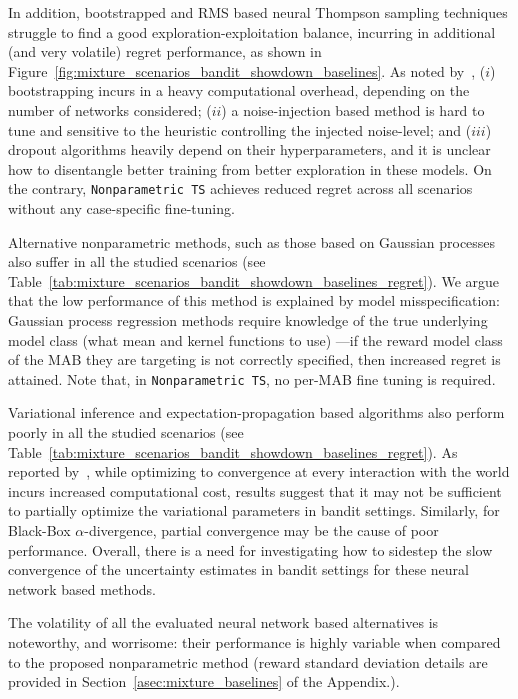 In addition, bootstrapped and RMS based neural Thompson sampling techniques struggle to find a good exploration-exploitation balance, incurring in additional (and very volatile) regret performance, as shown in Figure~\ref{fig:mixture_scenarios_bandit_showdown_baselines}.
As noted by~\citet{ip-Riquelme2018}, ($i$) bootstrapping incurs in a heavy computational overhead, depending on the number of networks considered; ($ii$) a noise-injection based method is hard to tune and sensitive to the heuristic controlling the injected noise-level; and ($iii$) dropout algorithms heavily depend on their hyperparameters, and it is unclear how to disentangle better training from better exploration in these models. On the contrary, \texttt{Nonparametric TS} achieves reduced regret across all scenarios without any case-specific fine-tuning.

Alternative nonparametric methods, such as those based on Gaussian processes also suffer in all the studied scenarios (see Table~\ref{tab:mixture_scenarios_bandit_showdown_baselines_regret}). We argue that the low performance of this method is explained by model misspecification: Gaussian process regression methods require knowledge of the true underlying model class (\ie what mean and kernel functions to use) ---if the reward model class of the MAB they are targeting is not correctly specified, then increased regret is attained. Note that, in \texttt{Nonparametric TS}, no per-MAB fine tuning is required.

Variational inference and expectation-propagation based algorithms also perform poorly in all the studied scenarios (see Table~\ref{tab:mixture_scenarios_bandit_showdown_baselines_regret}). As reported by~\citet{ip-Riquelme2018}, while optimizing to convergence at every interaction with the world incurs increased computational cost, results suggest that it may not be sufficient to partially optimize the variational parameters in bandit settings. Similarly, for Black-Box $\alpha$-divergence, partial convergence may be the cause of poor performance. Overall, there is a need for investigating how to sidestep the slow convergence of the uncertainty estimates in bandit settings for these neural network based methods.

The volatility of all the evaluated neural network based alternatives is noteworthy, and worrisome: their performance is highly variable when compared to the proposed nonparametric method (reward standard deviation details are provided in Section~\ref{asec:mixture_baselines} of the Appendix.).

